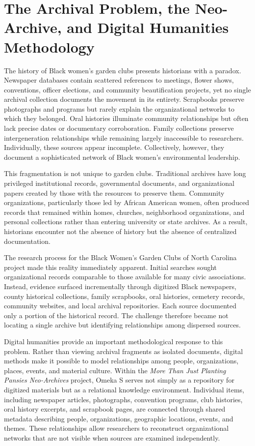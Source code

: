 \documentclass[final]{anthology-ch}
\begin{document}
\section{The Archival Problem, the Neo-Archive, and Digital Humanities Methodology} \label{sec:method}

The history of Black women's garden clubs presents historians with a paradox. Newspaper databases contain scattered references to meetings, flower shows, conventions, officer elections, and community beautification projects, yet no single archival collection documents the movement in its entirety. Scrapbooks preserve photographs and programs but rarely explain the organizational networks to which they belonged. Oral histories illuminate community relationships but often lack precise dates or documentary corroboration. Family collections preserve intergeneration relationships while remaining largely inaccessible to researchers. Individually, these sources appear incomplete. Collectively, however, they document a sophisticated network of Black women's environmental leadership.

This fragmentation is not unique to garden clubs. Traditional archives have long privileged institutional records, governmental documents, and organizational papers created by those with the resources to preserve them. Community organizations, particularly those led by African American women, often produced records that remained within homes, churches, neighborhood organizations, and personal collections rather than entering university or state archives. As a result, historians encounter not the absence of history but the absence of centralized documentation.

The research process for the Black Women's Garden Clubs of North Carolina project made this reality immediately apparent. Initial searches sought organizational records comparable to those available for many civic associations. Instead, evidence surfaced incrementally through digitized Black newspapers, county historical collections, family scrapbooks, oral histories, cemetery records, community websites, and local archival repositories. Each source documented only a portion of the historical record. The challenge therefore became not locating a single archive but identifying relationships among dispersed sources.

Digital humanities provide an important methodological response to this problem. Rather than viewing archival fragments as isolated documents, digital methods make it possible to model relationships among people, organizations, places, events, and material culture. Within the \textit{More Than Just Planting Pansies Neo-Archives} project, Omeka S serves not simply as a repository for digitized materials but as a relational knowledge environment. Individual items, including newspaper articles, photographs, convention programs, club histories, oral history excerpts, and scrapbook pages, are connected through shared metadata describing people, organizations, geographic locations, events, and themes. These relationships allow researchers to reconstruct organizational networks that are not visible when sources are examined independently.
\end{document}

